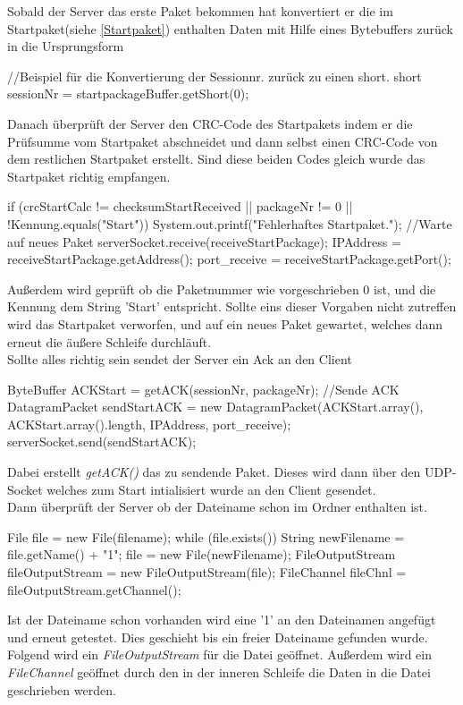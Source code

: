 \documentclass[a4paper, 12pt]{scrartcl}
\begin{document}
Sobald der Server das erste Paket bekommen hat konvertiert er die im Startpaket(siehe \ref{Startpaket}) enthalten Daten mit Hilfe eines Bytebuffers zurück in die Ursprungsform
\begin{javacode}
//Beispiel für die Konvertierung der Sessionnr. zurück zu einen short.
short sessionNr = startpackageBuffer.getShort(0);
\end{javacode} 
Danach überprüft der Server den CRC-Code des Startpakets indem er die Prüfsumme vom Startpaket abschneidet und dann selbst einen CRC-Code von dem restlichen Startpaket erstellt. Sind diese beiden Codes gleich wurde das Startpaket richtig empfangen.
\begin{javacode}
if (crcStartCalc != checksumStartReceived || packageNr != 0 || 
		!Kennung.equals("Start"))
{
	System.out.printf("Fehlerhaftes Startpaket.\n");
	//Warte auf neues Paket
	serverSocket.receive(receiveStartPackage); 
	IPAddress = receiveStartPackage.getAddress();
	port_receive = receiveStartPackage.getPort();
}
\end{javacode} 
Außerdem wird geprüft ob die Paketnummer wie vorgeschrieben 0 ist, und die Kennung dem String 'Start' entspricht.
Sollte eins dieser Vorgaben nicht zutreffen wird das Startpaket verworfen, und auf ein neues Paket gewartet, welches dann erneut die äußere Schleife durchläuft.\\
Sollte alles richtig sein sendet der Server ein Ack an den Client
\begin{javacode}
 ByteBuffer ACKStart = getACK(sessionNr, packageNr);
//Sende ACK
DatagramPacket sendStartACK = new DatagramPacket(ACKStart.array(), ACKStart.array().length, IPAddress, port_receive);      
serverSocket.send(sendStartACK); 
\end{javacode}
Dabei erstellt \textit{getACK()} das zu sendende Paket. Dieses wird dann über den UDP-Socket welches zum Start intialisiert wurde an den Client gesendet. 
\\
Dann überprüft der Server ob der Dateiname schon im Ordner enthalten ist.
\begin{javacode}
File file = new File(filename);
while (file.exists())
{
	String newFilename = file.getName() + "1";
	file = new File(newFilename);	
}
FileOutputStream fileOutputStream = new FileOutputStream(file);
FileChannel fileChnl = fileOutputStream.getChannel();
\end{javacode} 
Ist der Dateiname schon vorhanden wird eine '1' an den Dateinamen angefügt und erneut getestet. Dies geschieht bis ein freier Dateiname gefunden wurde.
Folgend wird ein \textit{FileOutputStream} für die Datei geöffnet. Außerdem wird ein \textit{FileChannel} geöffnet durch den in der inneren Schleife die Daten in die Datei geschrieben werden.
\\
\end{document}
